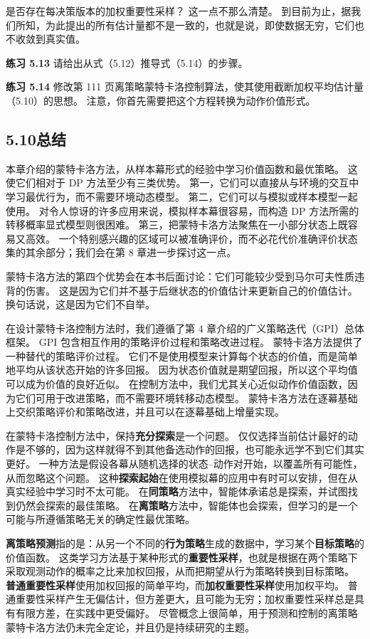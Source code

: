 \documentclass[UTF8,12pt,a4paper,fontset=fandol]{ctexart}
\begin{document}
是否存在每决策版本的加权重要性采样？
这一点不那么清楚。
到目前为止，据我们所知，为此提出的所有估计量都不是一致的，也就是说，即使数据无穷，它们也不收敛到真实值。

\noindent\textbf{练习 5.13}
请给出从式（5.12）推导式（5.14）的步骤。

\noindent\textbf{练习 5.14}
修改第 111 页离策略蒙特卡洛控制算法，使其使用截断加权平均估计量（5.10）的思想。
注意，你首先需要把这个方程转换为动作价值形式。

\subsection*{5.10\quad 总结}

本章介绍的蒙特卡洛方法，从样本幕形式的经验中学习价值函数和最优策略。
这使它们相对于 DP 方法至少有三类优势。
第一，它们可以直接从与环境的交互中学习最优行为，而不需要环境动态模型。
第二，它们可以与模拟或样本模型一起使用。
对令人惊讶的许多应用来说，模拟样本幕很容易，而构造 DP 方法所需的转移概率显式模型则很困难。
第三，把蒙特卡洛方法聚焦在一小部分状态上既容易又高效。
一个特别感兴趣的区域可以被准确评价，而不必花代价准确评价状态集的其余部分；我们会在第 8 章进一步探讨这一点。

蒙特卡洛方法的第四个优势会在本书后面讨论：它们可能较少受到马尔可夫性质违背的伤害。
这是因为它们并不基于后继状态的价值估计来更新自己的价值估计。
换句话说，这是因为它们不自举。

在设计蒙特卡洛控制方法时，我们遵循了第 4 章介绍的广义策略迭代（GPI）总体框架。
GPI 包含相互作用的策略评价过程和策略改进过程。
蒙特卡洛方法提供了一种替代的策略评价过程。
它们不是使用模型来计算每个状态的价值，而是简单地平均从该状态开始的许多回报。
因为状态价值就是期望回报，所以这个平均值可以成为价值的良好近似。
在控制方法中，我们尤其关心近似动作价值函数，因为它们可用于改进策略，而不需要环境转移动态模型。
蒙特卡洛方法在逐幕基础上交织策略评价和策略改进，并且可以在逐幕基础上增量实现。

在蒙特卡洛控制方法中，保持\textbf{充分探索}是一个问题。
仅仅选择当前估计最好的动作是不够的，因为这样就得不到其他备选动作的回报，也可能永远学不到它们其实更好。
一种方法是假设各幕从随机选择的状态--动作对开始，以覆盖所有可能性，从而忽略这个问题。
这种\textbf{探索起始}在使用模拟幕的应用中有时可以安排，但在从真实经验中学习时不太可能。
在\textbf{同策略}方法中，智能体承诺总是探索，并试图找到仍然会探索的最佳策略。
在\textbf{离策略}方法中，智能体也会探索，但学习的是一个可能与所遵循策略无关的确定性最优策略。

\textbf{离策略预测}指的是：从另一个不同的\textbf{行为策略}生成的数据中，学习某个\textbf{目标策略}的价值函数。
这类学习方法基于某种形式的\textbf{重要性采样}，也就是根据在两个策略下采取观测动作的概率之比来加权回报，从而把期望从行为策略转换到目标策略。
\textbf{普通重要性采样}使用加权回报的简单平均，而\textbf{加权重要性采样}使用加权平均。
普通重要性采样产生无偏估计，但方差更大，且可能为无穷；加权重要性采样总是具有有限方差，在实践中更受偏好。
尽管概念上很简单，用于预测和控制的离策略蒙特卡洛方法仍未完全定论，并且仍是持续研究的主题。
\end{document}
